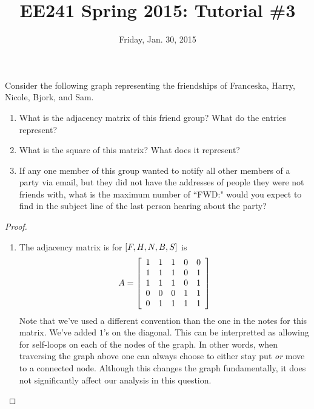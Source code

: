 \documentclass{tutorial}
\begin{document}
\newif\ifsolns

\solnstrue

\title{EE241 Spring 2015: Tutorial \#3}
\date{Friday, Jan. 30, 2015}
\maketitle

\begin{prob}
Consider the following graph representing the friendships of Franceska, Harry, Nicole, Bjork, and Sam.
\begin{center}  \end{center}
\begin{enumerate}[label=(\alph*)]
\item What is the adjacency matrix of this friend group? What do the entries represent?
\item What is the square of this matrix? What does it represent?
\item If any one member of this group wanted to notify all other members of a party via email, but they did not have the addresses of people they were not friends with, what is the maximum number of ``FWD:" would you expect to find in the subject line of the last person hearing about the party?
\end{enumerate}
\end{prob} \ifsolns \begin{proof}
\begin{enumerate}[label=(\alph*)]
\item The adjacency matrix is for $\left[ F, H, N, B, S \right]$ is
\[
    A = \left[ \begin{array}{ccccc}
        1 & 1 & 1 & 0 & 0 \\
        1 & 1 & 1 & 0 & 1 \\
        1 & 1 & 1 & 0 & 1 \\
        0 & 0 & 0 & 1 & 1 \\
        0 & 1 & 1 & 1 & 1 \\
    \end{array} \right]
\]
Note that we've used a different convention than the one in the notes for this matrix. We've added $1$'s on the diagonal. This can be interpretted as allowing for self-loops on each of the nodes of the graph. In other words, when traversing the graph above one can always choose to either stay put \emph{or} move to a connected node. Although this changes the graph fundamentally, it does not significantly affect our analysis in this question.

\end{enumerate}
\end{proof}
\end{document}
